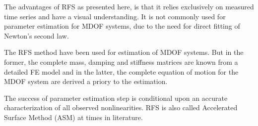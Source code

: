 The advantages of RFS as presented here, is that it relies exclusively on measured
time series and have a visual understanding. It is not commonly used for
parameter estimation for MDOF systems, due to the need for direct fitting of
Newton's second law.

The RFS method have been used for estimation of MDOF
systems\autocite{dossogne2015a,noel2014_phd}. But in the former, the complete
mass, damping and stiffness matrices are known from a detailed FE model and in
the latter, the complete equation of motion for the MDOF system are
derived a priory to the estimation.

The success of parameter estimation step is conditional upon an accurate
characterization of all observed nonlinearities.
RFS is also called Accelerated Surface Method (ASM) at times in literature.


